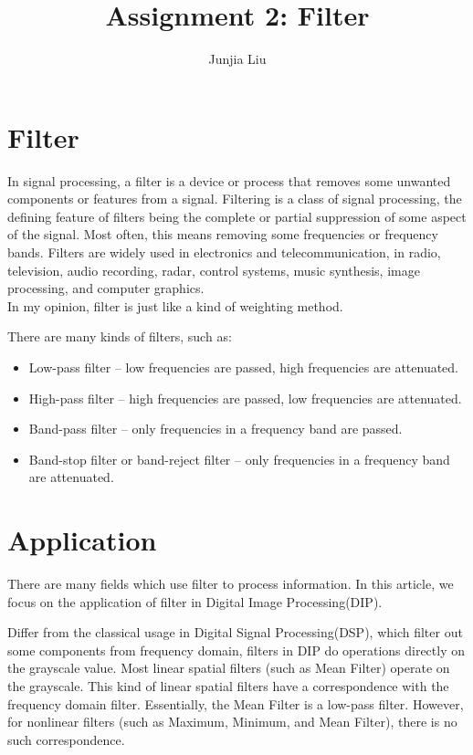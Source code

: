 \documentclass[12pt,a4paper]{article}
\author{Junjia Liu}
\affil{School of Mechanical Engineering, Shanghai Jiaotong University, junjialiu@sjtu.edu.cn}
\title{\textbf{Assignment 2: Filter}}
\begin{document}

\maketitle

\tableofcontents
\newpage

\section{Filter}
In signal processing, a filter is a device or process that removes some unwanted components or features from a signal. Filtering is a class of signal processing, the defining feature of filters being the complete or partial suppression of some aspect of the signal. Most often, this means removing some frequencies or frequency bands. Filters are widely used in electronics and telecommunication, in radio, television, audio recording, radar, control systems, music synthesis, image processing, and computer graphics.\\

In my opinion, filter is just like a kind of  weighting method.

There are many kinds of filters, such as:
\begin{itemize}
	\item Low-pass filter – low frequencies are passed, high frequencies are attenuated.
	\item High-pass filter – high frequencies are passed, low frequencies are attenuated.
	\item Band-pass filter – only frequencies in a frequency band are passed.
	\item Band-stop filter or band-reject filter – only frequencies in a frequency band are attenuated.
\end{itemize}

\section{Application}
There are many fields which use filter to process information. In this article, we focus on the application of filter in Digital Image Processing(DIP).

Differ from the classical usage in Digital Signal Processing(DSP), which filter out some components from frequency domain, filters in DIP do operations directly on the grayscale value. Most linear spatial filters (such as Mean Filter) operate on the  grayscale. This kind of linear spatial filters have a correspondence with the frequency domain filter. Essentially, the Mean Filter is a low-pass filter. However, for nonlinear filters (such as Maximum, Minimum, and Mean Filter), there is no such correspondence.
\end{document}
